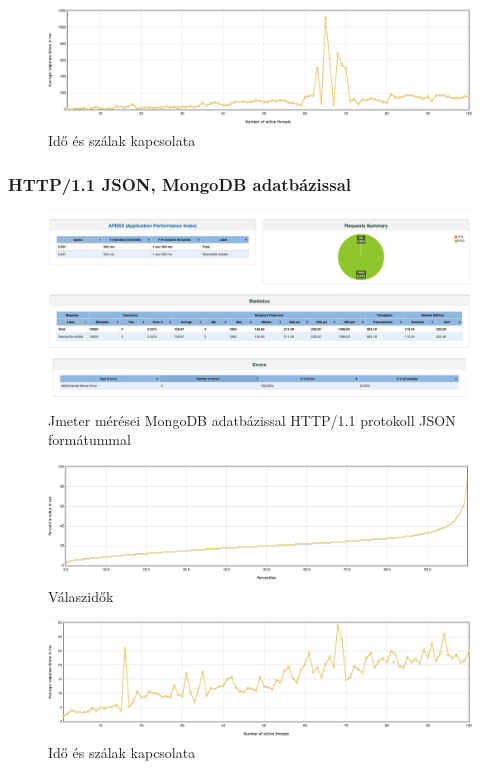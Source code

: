 \begin{figure}[hbt!]
    \centering
    \includegraphics[scale=0.3]{images/json-time-vs-threads}
    \caption{Idő és szálak kapcsolata}
    \label{fig:json-time-vs-threads}
\end{figure}

\subsubsection{HTTP/1.1 JSON, MongoDB adatbázissal}
\begin{figure}[hbt!]
    \centering
    \includegraphics[scale=0.2]{images/jmeter-json-postgres}
    \caption{Jmeter mérései MongoDB adatbázissal HTTP/1.1 protokoll JSON formátummal}
    \label{fig:jmeter-json-mongo}
\end{figure}

\begin{figure}[hbt!]
    \centering
    \includegraphics[scale=0.3]{images/json-mongo-response-times}
    \caption{Válaszidők}
    \label{fig:json-mongo-response-times}
\end{figure}

\begin{figure}[hbt!]
    \centering
    \includegraphics[scale=0.3]{images/json-mongo-time-vs-threads}
    \caption{Idő és szálak kapcsolata}
    \label{fig:json-mongo-time-vs-threads}
\end{figure}

